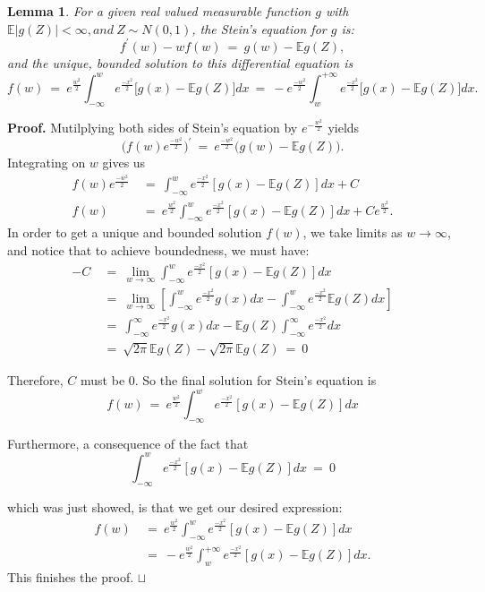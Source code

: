 \documentclass[12pt]{article}
\newcommand{\e}{\mathbb{E}}
\newcommand\qed{\hfill\hbox{\rlap{$\sqcap$}$\sqcup$}}
\newcommand{\eq }{\: = \:}
\newtheorem{lemma}{Lemma}
\theoremstyle{nonumberplain}
\begin{document}
\begin{lemma}
For a given real valued measurable function $g$ with $\mathbb{E}|g(Z)|<\infty, and\ Z\sim N(0,1)$, the Stein's equation for $g$ is:
$$
f^{\prime}(w)-wf(w)\eq g(w)-\mathbb{E}g(Z),
$$
and the unique, bounded solution to this differential equation is
\begin{equation}
f(w)\eq e^{\frac{w^{2}}{2}} \int_{-\infty}^{w} e^{\frac{-x^{2}}{2}}\bigl[g(x)-\mathbb{E}g(Z)\bigr]dx\eq -e^{\frac{-w^{2}}{2}} \int_{w}^{+\infty} e^{\frac{-x^{2}}{2}}\bigl[g(x)-\mathbb{E}g(Z)\bigr]dx.
\end{equation}
\end{lemma}
\textbf{Proof.} Mutilplying both sides of Stein's equation by $e^{-\frac{w^{2}}{2}}$ yields
$$
\bigl(f(w)e^{\frac{-w^{2}}{2}}\bigr)^{\prime}\eq e^{\frac{-w^{2}}{2}}\bigl(g(w)-\mathbb{E}g(Z)\bigr).
$$
Integrating on $w$ gives us
\begin{align*}
f(w)e^{\frac{-w^{2}}{2}}&\eq \int_{-\infty}^{w} e^{\frac{-x^{2}}{2}}[g(x)-\mathbb{E}g(Z)]dx + C\\
f(w)&\eq e^{\frac{w^{2}}{2}} \int_{-\infty}^{w} e^{\frac{-x^{2}}{2}}[g(x)-\mathbb{E}g(Z)]dx + Ce^{\frac{w^{2}}{2}}.
\end{align*}
In order to get a unique and bounded solution $f(w)$, we take limits as $w \to \infty$, and notice that to achieve boundedness, we must have:
\begin{align*}
 - C &\eq \lim \limits_{w \to \infty} \int_{-\infty}^{w} e^{\frac{-x^{2}}{2}}[g(x)-\mathbb{E}g(Z)]dx \\
 &\eq \lim \limits_{w \to \infty} [\int_{-\infty}^{w} e^{\frac{-x^{2}}{2}}g(x)dx - \int_{-\infty}^{w} e^{\frac{-x^{2}}{2}} \e g(Z)dx] \\
 & \eq \int_{-\infty}^{\infty} e^{\frac{-x^{2}}{2}}g(x)dx - \e g(Z) \int_{-\infty}^{\infty} e^{\frac{-x^{2}}{2}}dx \\
 & \eq \sqrt{2\pi} \e g(Z) - \sqrt{2\pi} \e g(Z) \eq 0
\end{align*}

Therefore, $C$ must be 0. So the final solution for Stein's equation is
$$
f(w)\eq e^{\frac{w^{2}}{2}} \int_{-\infty}^{w} e^{\frac{-x^{2}}{2}}[g(x)-\mathbb{E}g(Z)]dx
$$

Furthermore, a consequence of the fact that 
$$
\int_{-\infty}^{w} e^{\frac{-x^{2}}{2}}[g(x)-\mathbb{E}g(Z)]dx \eq 0
$$

which was just showed, is that we get our desired expression:
\begin{align*}
f(w)&\eq e^{\frac{w^{2}}{2}} \int_{-\infty}^{w} e^{\frac{-x^{2}}{2}}[g(x)-\mathbb{E}g(Z)]dx\\
&\eq -e^{\frac{w^{2}}{2}} \int_{w}^{+\infty} e^{\frac{-x^{2}}{2}}[g(x)-\mathbb{E}g(Z)]dx.
\end{align*}
This finishes the proof.
\qed
\end{document}
